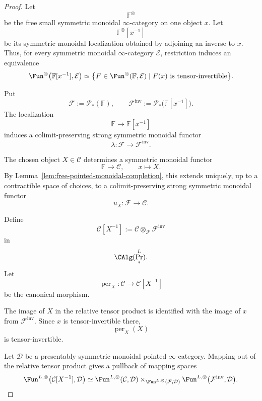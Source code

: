 \begin{proof}
Let
\[
    \mathbb F^\otimes
\]
be the free small symmetric monoidal \(\infty\)-category on one object
\(x\).  Let
\[
    \mathbb F^\otimes[x^{-1}]
\]
be its symmetric monoidal localization obtained by adjoining an inverse to
\(x\).  Thus, for every symmetric monoidal \(\infty\)-category
\(\mathcal E\), restriction induces an equivalence
\[
\begin{aligned}
    \Fun^\otimes
    \bigl(
      \mathbb F[x^{-1}],
      \mathcal E
    \bigr)
    \simeq
    \bigl\{
      F\in\Fun^\otimes(\mathbb F,\mathcal E)
      \mid
      F(x)\text{ is tensor-invertible}
    \bigr\}.
\end{aligned}
\]

Put
\[
    \mathcal F
    :=
    \mathcal P_*(\mathbb F),
    \qquad
    \mathcal F^{\mathrm{inv}}
    :=
    \mathcal P_*
    \bigl(
      \mathbb F[x^{-1}]
    \bigr).
\]
The localization
\[
    \mathbb F
    \longrightarrow
    \mathbb F[x^{-1}]
\]
induces a colimit-preserving strong symmetric monoidal functor
\[
    \lambda:
    \mathcal F
    \longrightarrow
    \mathcal F^{\mathrm{inv}}.
\]

The chosen object \(X\in\mathcal C\) determines a symmetric monoidal
functor
\[
    \mathbb F
    \longrightarrow
    \mathcal C,
    \qquad
    x\longmapsto X.
\]
By Lemma~\ref{lem:free-pointed-monoidal-completion}, this extends uniquely,
up to a contractible space of choices, to a colimit-preserving strong
symmetric monoidal functor
\[
    u_X:
    \mathcal F
    \longrightarrow
    \mathcal C.
\]

Define
\[
    \mathcal C[X^{-1}]
    :=
    \mathcal C
    \otimes_{\mathcal F}
    \mathcal F^{\mathrm{inv}}
\]
in
\[
    \CAlg(\Pr^L_*).
\]
Let
\[
    \operatorname{per}_X:
    \mathcal C
    \longrightarrow
    \mathcal C[X^{-1}]
\]
be the canonical morphism.

The image of \(X\) in the relative tensor product is identified with the
image of \(x\) from \(\mathcal F^{\mathrm{inv}}\).  Since \(x\) is
tensor-invertible there,
\[
    \operatorname{per}_X(X)
\]
is tensor-invertible.

Let \(\mathcal D\) be a presentably symmetric monoidal pointed
\(\infty\)-category.  Mapping out of the relative tensor product gives a
pullback of mapping spaces
\[
\begin{aligned}
    \Fun^{L,\otimes}
    \bigl(
      \mathcal C[X^{-1}],
      \mathcal D
    \bigr)
    \simeq
    \Fun^{L,\otimes}(\mathcal C,\mathcal D)
    \times_{\Fun^{L,\otimes}(\mathcal F,\mathcal D)}
    \Fun^{L,\otimes}
    \bigl(
      \mathcal F^{\mathrm{inv}},
      \mathcal D
    \bigr).
\end{aligned}
\]


\end{proof}
